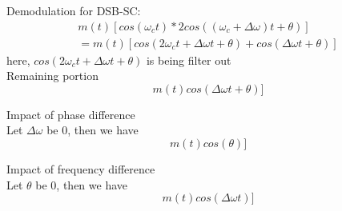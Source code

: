 \documentclass{article}
\begin{document}
Demodulation for DSB-SC:
\begin{equation}
    \begin{split}
        m(t)[cos(\omega_ct) * 2cos((\omega_c+\Delta\omega)t+\theta)]\\
        =m(t)[cos(2\omega_ct+\Delta\omega t+\theta) + cos(\Delta\omega t+\theta)]
    \end{split}
\end{equation}
here, $cos(2\omega_ct+\Delta\omega t+\theta)$ is being filter out \\
Remaining portion
\begin{equation}
    m(t)cos(\Delta\omega t+\theta)]
\end{equation}

Impact of phase difference\\
Let $\Delta\omega$ be 0, then we have
\begin{equation}
    m(t)cos(\theta)]
\end{equation}

Impact of frequency difference\\
Let $\theta$ be 0, then we have
\begin{equation}
    m(t)cos(\Delta\omega t)]
\end{equation}
\end{document}
